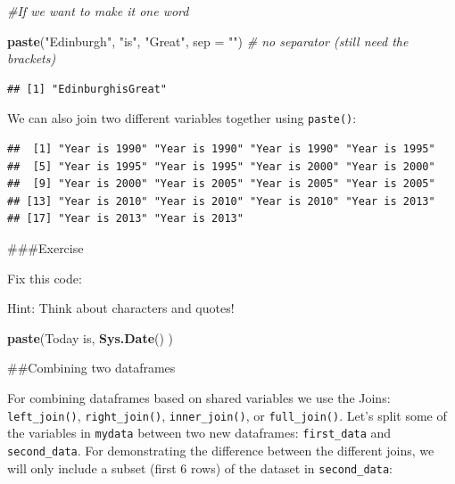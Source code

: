 \documentclass[]{book}
\makeatletter
\newenvironment{Shaded}{\begin{snugshade}}{\end{snugshade}}
\newcommand{\CommentTok}[1]{\textcolor[rgb]{0.56,0.35,0.01}{\textit{#1}}}
\newcommand{\DataTypeTok}[1]{\textcolor[rgb]{0.13,0.29,0.53}{#1}}
\newcommand{\KeywordTok}[1]{\textcolor[rgb]{0.13,0.29,0.53}{\textbf{#1}}}
\newcommand{\NormalTok}[1]{#1}
\newcommand{\OperatorTok}[1]{\textcolor[rgb]{0.81,0.36,0.00}{\textbf{#1}}}
\newcommand{\StringTok}[1]{\textcolor[rgb]{0.31,0.60,0.02}{#1}}
\newenvironment{kframe}{%
\medskip{}
\setlength{\fboxsep}{.8em}
 \def\at@end@of@kframe{}%
 \ifinner\ifhmode%
  \def\at@end@of@kframe{\end{minipage}}%
  \begin{minipage}{\columnwidth}%
 \fi\fi%
 \def\FrameCommand##1{\hskip\@totalleftmargin \hskip-\fboxsep
 \colorbox{shadecolor}{##1}\hskip-\fboxsep
     \hskip-\linewidth \hskip-\@totalleftmargin \hskip\columnwidth}%
 \MakeFramed {\advance\hsize-\width
   \@totalleftmargin\z@ \linewidth\hsize
   \@setminipage}}%
 {\par\unskip\endMakeFramed%
 \at@end@of@kframe}
\renewenvironment{Shaded}{\begin{kframe}}{\end{kframe}}
\theoremstyle{definition}
\theoremstyle{definition}
\theoremstyle{definition}
\theoremstyle{remark}
\makeatother
\begin{document}
\begin{Shaded}
\begin{Highlighting}[]
\CommentTok{#If we want to make it one word}

\KeywordTok{paste}\NormalTok{(}\StringTok{"Edinburgh"}\NormalTok{, }\StringTok{"is"}\NormalTok{, }\StringTok{"Great"}\NormalTok{, }\DataTypeTok{sep =} \StringTok{""}\NormalTok{) }\CommentTok{# no separator (still need the brackets)}
\end{Highlighting}
\end{Shaded}

\begin{verbatim}
## [1] "EdinburghisGreat"
\end{verbatim}

We can also join two different variables together using
\texttt{paste()}:

\begin{Shaded}
\end{Shaded}

\begin{verbatim}
##  [1] "Year is 1990" "Year is 1990" "Year is 1990" "Year is 1995"
##  [5] "Year is 1995" "Year is 1995" "Year is 2000" "Year is 2000"
##  [9] "Year is 2000" "Year is 2005" "Year is 2005" "Year is 2005"
## [13] "Year is 2010" "Year is 2010" "Year is 2010" "Year is 2013"
## [17] "Year is 2013" "Year is 2013"
\end{verbatim}

\#\#\#Exercise

Fix this code:

Hint: Think about characters and quotes!

\begin{Shaded}
\begin{Highlighting}[]
\KeywordTok{paste}\NormalTok{(Today is, }\KeywordTok{Sys.Date}\NormalTok{() )}
\end{Highlighting}
\end{Shaded}

\#\#Combining two dataframes

For combining dataframes based on shared variables we use the Joins:
\texttt{left\_join()}, \texttt{right\_join()}, \texttt{inner\_join()},
or \texttt{full\_join()}. Let's split some of the variables in
\texttt{mydata} between two new dataframes: \texttt{first\_data} and
\texttt{second\_data}. For demonstrating the difference between the
different joins, we will only include a subset (first 6 rows) of the
dataset in \texttt{second\_data}:
\end{document}
